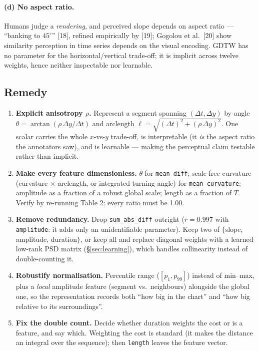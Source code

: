 \documentclass[11pt]{article}
\newcommand{\code}[1]{\texttt{\small #1}}
\begin{document}
\paragraph{(d) No aspect ratio.} Humans judge a \emph{rendering}, and perceived slope depends
on aspect ratio --- ``banking to $45^\circ$'' [18], refined empirically by [19]; Gogolou et
al.\ [20] show similarity perception in time series depends on the visual encoding. GDTW has
no parameter for the horizontal/vertical trade-off; it is implicit across twelve weights,
hence neither inspectable nor learnable.

\subsection{Remedy}
\begin{enumerate}[leftmargin=*]
  \item \textbf{Explicit anisotropy $\rho$.} Represent a segment spanning $(\Delta t,\Delta
  y)$ by angle $\theta = \arctan(\rho\,\Delta y/\Delta t)$ and arclength
  $\ell = \sqrt{(\Delta t)^2 + (\rho\,\Delta y)^2}$. One scalar carries the whole $x$-vs-$y$
  trade-off, is interpretable (it \emph{is} the aspect ratio the annotators saw), and is
  learnable --- making the perceptual claim testable rather than implicit.
  \item \textbf{Make every feature dimensionless.} $\theta$ for \code{mean\_diff};
  scale-free curvature (curvature $\times$ arclength, or integrated turning angle) for
  \code{mean\_curvature}; amplitude as a fraction of a robust global scale; length as a
  fraction of $T$. Verify by re-running Table 2: every ratio must be 1.00.
  \item \textbf{Remove redundancy.} Drop \code{sum\_abs\_diff} outright ($r=0.997$ with
  \code{amplitude}: it adds only an unidentifiable parameter). Keep two of
  $\{$slope, amplitude, duration$\}$, or keep all and replace diagonal weights with a learned
  low-rank PSD matrix (\S\ref{sec:learning}), which handles collinearity instead of
  double-counting it.
  \item \textbf{Robustify normalisation.} Percentile range ($[p_1,p_{99}]$) instead of
  min--max, plus a \emph{local} amplitude feature (segment vs.\ neighbours) alongside the
  global one, so the representation records both ``how big in the chart'' and ``how big
  relative to its surroundings''.
  \item \textbf{Fix the double count.} Decide whether duration weights the cost or is a
  feature, and say which. Weighting the cost is standard (it makes the distance an integral
  over the sequence); then \code{length} leaves the feature vector.
\end{enumerate}
\end{document}
